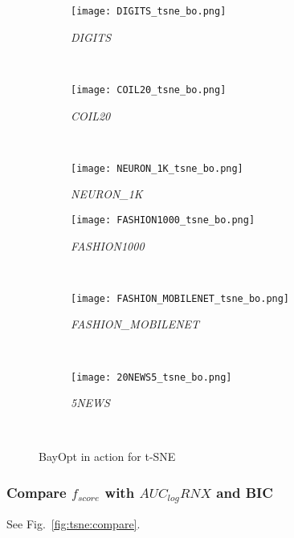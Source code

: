 \begin{figure*}[pos=h]
    \begin{subfigure}[b]{.32\textwidth}
        \centering
        \texttt{[image: DIGITS\_tsne\_bo.png]}
        \caption{\emph{DIGITS}}
    \end{subfigure}
    ~
    \begin{subfigure}[b]{.32\textwidth}
        \centering
        \texttt{[image: COIL20\_tsne\_bo.png]}
        \caption{\emph{COIL20}}
    \end{subfigure}
    ~
    \begin{subfigure}[b]{.32\textwidth}
        \centering
        \texttt{[image: NEURON\_1K\_tsne\_bo.png]}
        \caption{\emph{NEURON\_1K}}
    \end{subfigure}
    \vfill
    \begin{subfigure}[b]{.32\textwidth}
        \centering
        \texttt{[image: FASHION1000\_tsne\_bo.png]}
        \caption{\emph{FASHION1000}}
    \end{subfigure}
    ~
    \begin{subfigure}[b]{.32\textwidth}
        \centering
        \texttt{[image: FASHION\_MOBILENET\_tsne\_bo.png]}
        \caption{\emph{FASHION\_MOBILENET}}
    \end{subfigure}
    ~
    \begin{subfigure}[b]{.32\textwidth}
        \centering
        \texttt{[image: 20NEWS5\_tsne\_bo.png]}
        \caption{\emph{5NEWS}}
    \end{subfigure}
    ~
    \caption{BayOpt in action for t-SNE}
    \label{fig:tsne:bo:all}
\end{figure*}


\subsubsection*{Compare $f_{score}$ with $AUC_{log}RNX$ and BIC}
See Fig.~\ref{fig:tsne:compare}.

